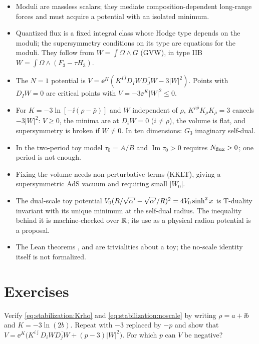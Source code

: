 \begin{summarybox}
\begin{itemize}[leftmargin=*,itemsep=1pt]
\item Moduli are massless scalars; they mediate composition-dependent long-range forces and
 must acquire a potential with an isolated minimum.
\item Quantized flux is a fixed integral class whose Hodge type depends on the moduli; the
 supersymmetry conditions on its type are equations for the moduli. They follow from
 $W=\int\Omega\wedge G$ (GVW), in type IIB $W=\int\Omega\wedge(F_3-\tau H_3)$.
\item The $N=1$ potential is $V=\ee^K(K^{I\bar J}D_IW\overline{D_JW}-3|W|^2)$. Points with
 $D_IW=0$ are critical points with $V=-3\ee^K|W|^2\le0$.
\item For $K=-3\ln[-\ii(\rho-\bar\rho)]$ and $W$ independent of $\rho$,
 $K^{\rho\bar\rho}K_\rho K_{\bar\rho}=3$ cancels $-3|W|^2$: $V\ge0$, the minima are at
 $D_iW=0$ ($i\ne\rho$), the volume is flat, and supersymmetry is broken if $W\ne0$. In ten
 dimensions: $G_3$ imaginary self-dual.
\item In the two-period toy model $\bar\tau_0=A/B$ and $\operatorname{Im}\tau_0>0$ requires
 $N_{\rm flux}>0$; one period is not enough.
\item Fixing the volume needs non-perturbative terms (KKLT), giving a supersymmetric AdS
 vacuum and requiring small $|W_0|$.
\item The dual-scale toy potential $V_0(R/\sqrt{\alpha'}-\sqrt{\alpha'}/R)^2=4V_0\sinh^2x$ is
 T-duality invariant with its unique minimum at the self-dual radius. The inequality behind
 it is machine-checked over $\mathbb{R}$; its use as a physical radion potential is a proposal.
\item The Lean theorems ,  and
  are trivialities about a toy; the no-scale identity
 itself is not formalized.
\end{itemize}
\end{summarybox}

\section*{Exercises}

\begin{exercise}[$\star$]
Verify \eqref{eq:stabilization:Krho} and \eqref{eq:stabilization:noscale} by writing
$\rho=a+\ii b$ and $K=-3\ln(2b)$. Repeat with $-3$ replaced by $-p$ and show that
$V=\ee^K\bigl(K^{i\bar\jmath}D_iW\overline{D_jW}+(p-3)|W|^2\bigr)$. For which $p$ can $V$ be
negative?
\end{exercise}


